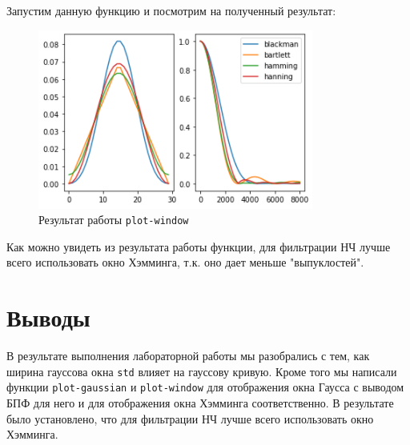 \documentclass[a4paper]{article}
\begin{document}
            Запустим данную функцию и посмотрим на полученный результат:
            
            \begin{figure}[H]
                \centering
                \includegraphics[width=\textwidth]{ex_3_result.png}
                \caption{Результат работы \texttt{plot-window}}
                \label{fig:ex_3_result}
            \end{figure}
            
            Как можно увидеть из результата работы функции, для фильтрации НЧ лучше всего использовать окно Хэмминга, т.к. оно дает меньше "выпуклостей".
            
            
    \newpage
        \section{Выводы}
             В результате выполнения лабораторной работы мы разобрались с тем, как ширина гауссова окна \texttt{std} влияет на гауссову кривую. Кроме того мы написали функции \texttt{plot-gaussian} и \texttt{plot-window} для отображения окна Гаусса с выводом БПФ для него и для отображения окна Хэмминга соответственно. В результате было установлено, что для фильтрации НЧ лучше всего использовать окно Хэмминга.
            
\end{document}
